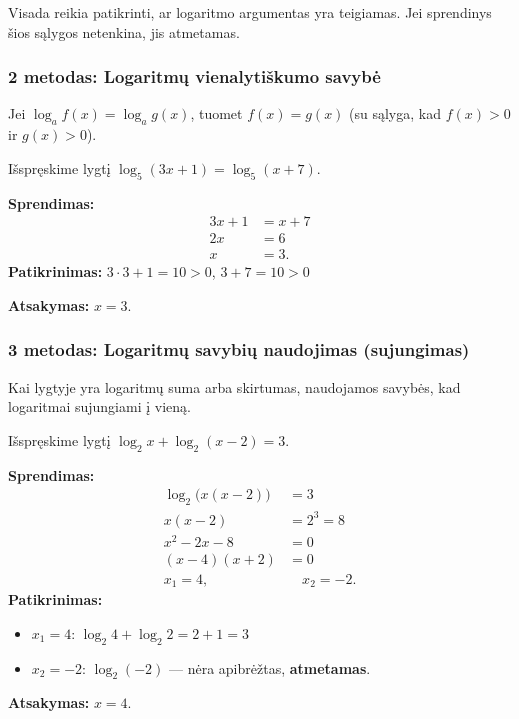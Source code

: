 \begin{remark}
Visada reikia patikrinti, ar logaritmo argumentas yra teigiamas. Jei sprendinys šios sąlygos netenkina, jis atmetamas.
\end{remark}

\subsubsection*{2 metodas: Logaritmų vienalytiškumo savybė}

Jei $\log_a f(x) = \log_a g(x)$, tuomet $f(x) = g(x)$ (su sąlyga, kad $f(x) > 0$ ir $g(x) > 0$).

\begin{example}
Išspręskime lygtį $\log_5(3x + 1) = \log_5(x + 7)$.

\textbf{Sprendimas:}
\begin{align*}
3x + 1 &= x + 7 \\
2x &= 6 \\
x &= 3.
\end{align*}
\textbf{Patikrinimas:} $3 \cdot 3 + 1 = 10 > 0$, $3 + 7 = 10 > 0$ \checkmark

\textbf{Atsakymas:} $x = 3$.
\end{example}

\subsubsection*{3 metodas: Logaritmų savybių naudojimas (sujungimas)}

Kai lygtyje yra logaritmų suma arba skirtumas, naudojamos savybės, kad logaritmai sujungiami į vieną.

\begin{example}
Išspręskime lygtį $\log_2 x + \log_2(x - 2) = 3$.

\textbf{Sprendimas:}
\begin{align*}
\log_2\bigl(x(x-2)\bigr) &= 3 \\
x(x - 2) &= 2^3 = 8 \\
x^2 - 2x - 8 &= 0 \\
(x - 4)(x + 2) &= 0 \\
x_1 = 4,&\quad x_2 = -2.
\end{align*}
\textbf{Patikrinimas:}
\begin{itemize}
    \item $x_1 = 4$: $\log_2 4 + \log_2 2 = 2 + 1 = 3$ \checkmark
    \item $x_2 = -2$: $\log_2(-2)$ — nėra apibrėžtas, \textbf{atmetamas}.
\end{itemize}

\textbf{Atsakymas:} $x = 4$.
\end{example}

